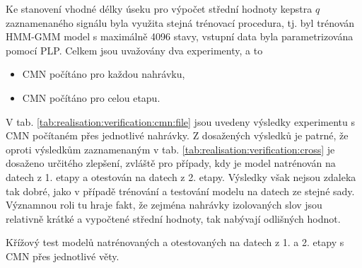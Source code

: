 Ke stanovení vhodné délky úseku pro výpočet střední hodnoty kepstra $q$ zaznamenaného signálu byla využita stejná trénovací procedura, tj. byl
trénován HMM-GMM model s maximálně 4096 stavy, vstupní data byla parametrizována pomocí PLP.
Celkem jsou uvažovány dva experimenty, a to

\begin{itemize}
  \item CMN počítáno pro každou nahrávku,
  \item CMN počítáno pro celou etapu.
\end{itemize}

V tab. \ref{tab:realisation:verification:cmn:file} jsou uvedeny výsledky experimentu s CMN počítaném přes jednotlivé nahrávky.
Z dosažených výsledků je patrné, že oproti výsledkům zaznamenaným v tab. \ref{tab:realisation:verification:cross} je dosaženo určitého zlepšení, zvláště pro případy, kdy je model natrénován na datech z 1. etapy a otestován na datech z 2. etapy.
Výsledky však nejsou zdaleka tak dobré, jako v případě trénování a testování modelu na datech ze stejné sady.
Významnou roli tu hraje fakt, že zejména nahrávky izolovaných slov jsou relativně krátké a vypočtené střední hodnoty, tak nabývají odlišných hodnot.

\begin{table}[htpb]
  \centering
  \def\arraystretch{1.5}
  \caption[Křížový test s CMN přes jednotlivé věty.]{Křížový test modelů natrénovaných a otestovaných na datech z 1. a 2. etapy s CMN  přes jednotlivé věty.}
  \label{tab:realisation:verification:cmn:file}
\end{table}

